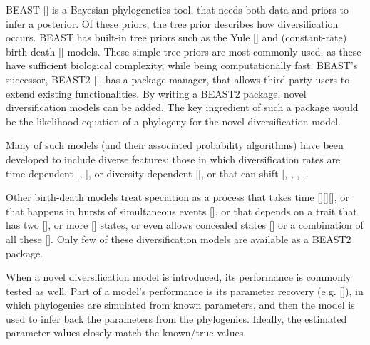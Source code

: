 \documentclass{article}
\begin{document}
BEAST [\cite{drummond2007beast}] is a Bayesian phylogenetics tool, 
that needs both data and priors to infer a posterior.
Of these priors, the tree prior describes how diversification occurs.
BEAST has built-in tree priors such as the Yule [\cite{yule}] and 
(constant-rate) birth-death [\cite{nee1994reconstructed}] models.
These simple tree priors are most commonly used, as these 
have sufficient biological complexity, while being computationally fast.
BEAST's successor, BEAST2 [\cite{bouckaert2014beast}],
has a package manager, that allows third-party users to extend existing 
functionalities.
By writing a BEAST2 package, novel diversification models can be added.
The key ingredient of such a package would be the likelihood equation
of a phylogeny for the novel diversification model.

Many of such models (and their associated probability 
algorithms) have been
developed to include diverse features: those in which diversification rates are 
time-dependent [\cite{nee1994reconstructed}, \cite{rabosky2008explosive}], 
or diversity-dependent [\cite{etienne2011diversity}],
or that can shift [\cite{etienne2012conceptual}, 
\cite{rabosky2014automatic}, \cite{alfaro2009nine}, \cite{laudanno2018sls}].

Other birth-death models treat speciation as a process that takes 
time [\cite{rosindell2010protracted}][\cite{etienne2012prolonging}][\cite{lambert2015reconstructed}], 
or that happens in bursts of simultaneous 
events [\cite{laudanno2018mbd}], or that
depends on a trait that has two [\cite{maddison2007estimating}], 
or more [\cite{fitzjohn2012diversitree}] states,
or even allows concealed states [\cite{beaulieu2016detecting}] 
or a combination of all these [\cite{herrera2018detecting}].
Only few of these diversification models are available as a BEAST2 package.

When a novel diversification model is introduced,
its performance is commonly tested as well.
Part of a model's performance is its parameter 
recovery (e.g. [\cite{etienne2014estimating}]),
in which phylogenies are simulated from known parameters, 
and then the model is used to infer back the parameters from the phylogenies.
Ideally, the estimated parameter values closely match the known/true values.
\end{document}
